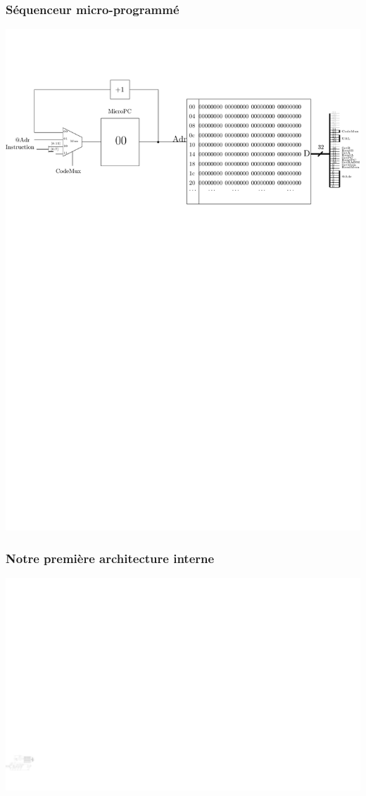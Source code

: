 \documentclass{beamer}
\begin{document}
\begin{frame}
\frametitle{Séquenceur micro-programmé}
\centering\includegraphics[width=\linewidth]{Figs/sequenceur_micro.pdf}
\end{frame}

\begin{frame}
\frametitle{Notre première architecture interne}
\centering\includegraphics[width=\linewidth]{Figs/premier_chemin_seq.pdf}
\end{frame}
\end{document}
